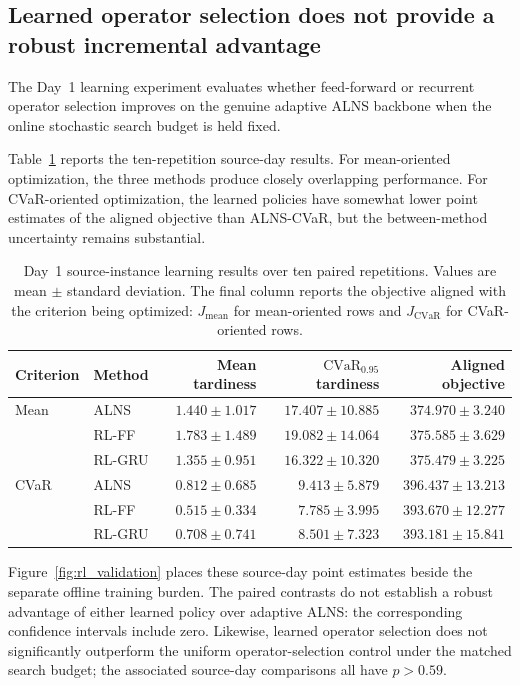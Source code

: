 \documentclass[preprint,12pt]{elsarticle}
\newcommand{\CVaR}{\mathrm{CVaR}}
\newcommand{\1}{\mathbf{1}}
\begin{document}
\subsection{Learned operator selection does not provide a robust incremental advantage}
\label{subsec:results_rl}

The Day~1 learning experiment evaluates whether feed-forward or recurrent
operator selection improves on the genuine adaptive ALNS backbone when the
online stochastic search budget is held fixed.

Table~\ref{tab:rl_day1} reports the ten-repetition source-day results.
For mean-oriented optimization, the three methods produce closely overlapping
performance. For CVaR-oriented optimization, the learned policies have somewhat
lower point estimates of the aligned objective than ALNS-CVaR, but the
between-method uncertainty remains substantial.

\begin{table}[t]
	\centering
	\caption{Day~1 source-instance learning results over ten paired repetitions.
		Values are mean $\pm$ standard deviation. The final column reports the objective
		aligned with the criterion being optimized: $J_{\mathrm{mean}}$ for
		mean-oriented rows and $J_{\mathrm{CVaR}}$ for CVaR-oriented rows.}
	\label{tab:rl_day1}
		\footnotesize
	\begin{tabular}{llrrr}
		\toprule
		Criterion &
		Method &
		Mean tardiness &
		$\CVaR_{0.95}$ tardiness &
		Aligned objective \\
		\midrule
		Mean &
		ALNS &
		$1.440\pm1.017$ &
		$17.407\pm10.885$ &
		$374.970\pm3.240$ \\
		&
		RL-FF &
		$1.783\pm1.489$ &
		$19.082\pm14.064$ &
		$375.585\pm3.629$ \\
		&
		RL-GRU &
		$1.355\pm0.951$ &
		$16.322\pm10.320$ &
		$375.479\pm3.225$ \\
		\midrule
		CVaR &
		ALNS &
		$0.812\pm0.685$ &
		$9.413\pm5.879$ &
		$396.437\pm13.213$ \\
		&
		RL-FF &
		$0.515\pm0.334$ &
		$7.785\pm3.995$ &
		$393.670\pm12.277$ \\
		&
		RL-GRU &
		$0.708\pm0.741$ &
		$8.501\pm7.323$ &
		$393.181\pm15.841$ \\
		\bottomrule
	\end{tabular}
\end{table}

Figure~\ref{fig:rl_validation} places these source-day point estimates beside the separate offline training burden.
The paired contrasts do not establish a robust advantage of either learned
policy over adaptive ALNS: the corresponding confidence intervals include zero.
Likewise, learned operator selection does not significantly outperform the
uniform operator-selection control under the matched search budget; the
associated source-day comparisons all have $p>0.59$.
\end{document}
